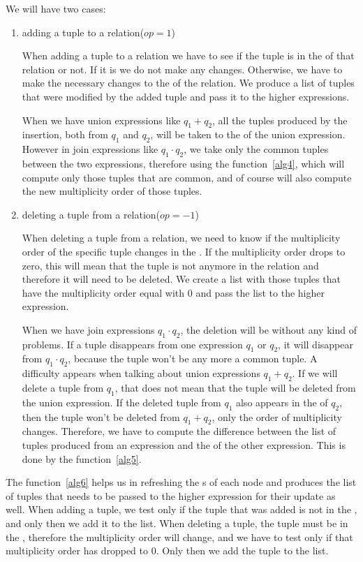 \documentclass[12pt]{article}
\begin{document}
We will have two cases:
\begin{enumerate}
\item adding a tuple to a relation($op=1$)

When adding a tuple to a relation we have to see if the tuple is in the \dom{} of that relation or not. If it is we do not make any changes. Otherwise, we have to make the necessary changes to the \dom{} of the relation. We produce a list of tuples that were modified by the added tuple and pass it to the higher expressions.

When we have union expressions like $q_1+q_2$, all the tuples produced by the insertion, both from $q_1$ and $q_2$, will be taken to the \dom{} of the union expression. However in join expressions like $q_1\cdot q_2$, we take only the common tuples between the two expressions, therefore using the function~\ref{alg4}, which will compute only those tuples that are common, and of course will also compute the new multiplicity order of those tuples.
\item deleting a tuple from a relation($op=-1$)

When deleting a tuple from a relation, we need to know if the multiplicity order of the specific tuple changes in the \dom{}. If the multiplicity order drops to zero, this will mean that the tuple is not anymore in the relation and therefore it will need to be deleted. We create a list with those tuples that have the multiplicity order equal with 0 and pass the list to the higher expression.

When we have join expressions $q_1\cdot q_2$, the deletion will be without any kind of problems. If a tuple disappears from one expression $q_1$ or $q_2$, it will disappear from $q_1\cdot q_2$, because the tuple won't be any more a common tuple. A difficulty appears when talking about union expressions $q_1+q_2$. If we will delete a tuple from $q_1$, that does not mean that the tuple will be deleted from the union expression. If the deleted tuple from $q_1$ also appears in the \dom{} of $q_2$, then the tuple won't be deleted from $q_1+q_2$, only the order of multiplicity changes. Therefore, we have to compute the difference between the list of tuples produced from an expression and the \dom{} of the other expression. This is done by the function~\ref{alg5}.
\end{enumerate}

The function~\ref{alg6} helps us in refreshing the \dom{}s of each node and produces the list of tuples that needs to be passed to the higher expression for their update as well. When adding a tuple, we test only if the tuple that was added is not in the \dom{}, and only then we add it to the list. When deleting a tuple, the tuple must be in the \dom{}, therefore the multiplicity order will change, and we have to test only if that multiplicity order has dropped to 0. Only then we add the tuple to the list.
\end{document}
